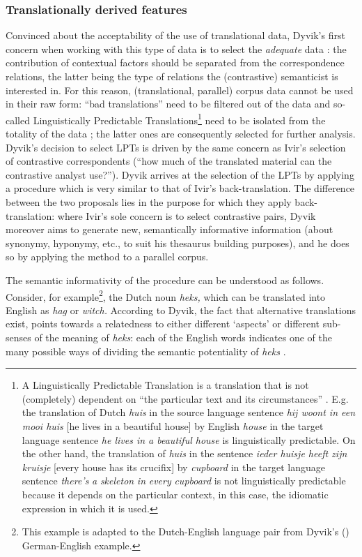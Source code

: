 \subsubsection{Translationally derived features}
\label{sec:2.3.4.2}  
Convinced about the acceptability of the use of translational data, Dyvik’s first concern when working with this type of data is to select the \textit{adequate} data \citep[52]{johansson_translational_1998}: the contribution of contextual factors should be separated from the correspondence relations, the latter being the type of relations the (contrastive) semanticist is interested in. For this reason, (translational, parallel) corpus data cannot be used in their raw form: “bad translations” need to be filtered out of the data and so-called Linguistically Predictable Translations\footnote{A Linguistically Predictable Translation is a translation that is not (completely) dependent on “the particular text and its circumstances” \citep{johansson_translational_1998}. E.g. the translation of Dutch \textit{huis} in the source language sentence \textit{hij woont in een mooi huis} [he lives in a beautiful house] by English \textit{house} in the target language sentence \textit{he lives in a beautiful house} is linguistically predictable. On the other hand, the translation of \textit{huis} in the sentence \textit{ieder huisje heeft zijn kruisje} [every house has its crucifix] by \textit{cupboard} in the target language sentence \textit{there’s} \textit{a} \textit{skeleton} \textit{in} \textit{every} \textit{cupboard} is not linguistically predictable because it depends on the particular context, in this case, the idiomatic expression in which it is used.} need to be isolated from the totality of the data \citep{johansson_translational_1998}; the latter ones are consequently selected for further analysis. Dyvik’s decision to select LPTs is driven by the same concern as Ivir’s selection of contrastive correspondents (“how much of the translated material can the contrastive analyst use?”). Dyvik arrives at the selection of the LPTs by applying a procedure which is very similar to that of Ivir’s back-translation. The difference between the two proposals lies in the purpose for which they apply back-translation: where Ivir’s sole concern is to select contrastive pairs, Dyvik moreover aims to generate new, semantically informative information (about synonymy, hyponymy, etc., to suit his thesaurus building purposes), and he does so by applying the method to a parallel corpus.

The semantic informativity of the procedure can be understood as follows. Consider, for example\footnote{This example is adapted to the Dutch-English language pair from Dyvik’s (\citeyear[29--31]{langemets_translations_2005}) German-English example.}, the Dutch noun \textit{heks,} which can be translated into English as \textit{hag} or \textit{witch.} According to Dyvik, the fact that alternative translations exist, points towards a relatedness to either different ‘aspects’ or different sub-senses of the meaning of \textit{heks}: each of the English words indicates one of the many possible ways of dividing the semantic potentiality of \textit{heks} \citep[31]{langemets_translations_2005}.

